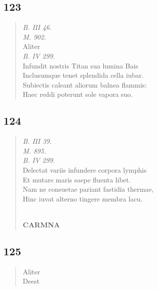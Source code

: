 \documentclass[11pt, a4paper]{report}
\begin{document}
            \subsection*{123}
      \begin{verse}
      \textit{B. III 46.} \\ \textit{M. 902.} \\ Aliter \\ \textit{B. IV 299.} \\ Infundit nostris Titan sua lumina Bais \\ Inclusumque tenet splendida cella iubar. \\ Subiectis caleant aliorum balnea flammis: \\ Haec reddi poterunt sole vapora suo. \\ 
      \end{verse}
  
            \subsection*{124}
      \begin{verse}
      \textit{B. III 39.} \\ \textit{M. 895.} \\ \textit{B. IV 299.} \\ Delectat variis infundere corpora lymphis \\ Et mutare maris saepe fluenta libet. \\ Nam ne consuetae pariant fastidia thermae, \\ Hinc iuvat alterno tingere membra lacu. \\ 
        ﻿\pagebreak 
     \marginpar{[136]} \begin{center} \textbf{CARMNA} \end{center}
      \end{verse}
  
            \subsection*{125}
      \begin{verse}
      Aliter \\ Deest \\ 
      \end{verse}
  
\end{document}
